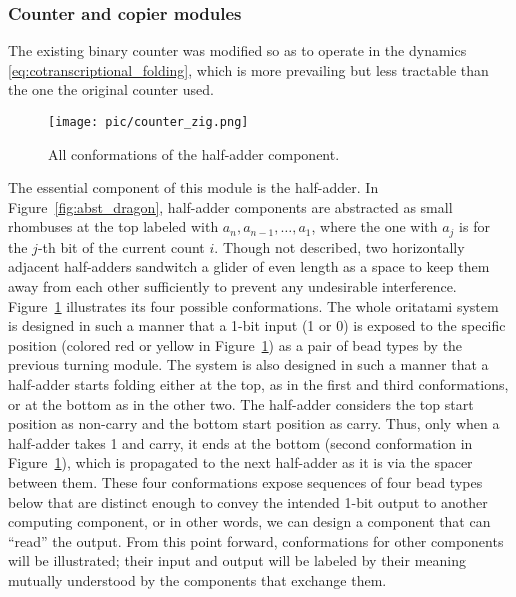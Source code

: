 			\subsubsection{Counter and copier modules}
			\label{subsubsec:module_counter}

The existing binary counter \cite{GeMeScSe2016} was modified so as to operate in the dynamics \eqref{eq:cotranscriptional_folding}, which is more prevailing \cite{GeMeScSe2015,HanKim2017,HaKiOtSe2016,OtaSeki2017} but less tractable than the one the original counter used. 

\begin{figure}[h]
\texttt{[image: pic/counter\_zig.png]}
 \caption{All conformations of the half-adder component.}
\label{fig:half-adder}
\end{figure}

The essential component of this module is the half-adder. 
In Figure~\ref{fig:abst_dragon}, half-adder components are abstracted as small rhombuses at the top labeled with $a_n, a_{n-1}, \ldots, a_1$, where the one with $a_j$ is for the $j$-th bit of the current count $i$. 
Though not described, two horizontally adjacent half-adders sandwitch a glider of even length as a space to keep them away from each other sufficiently to prevent any undesirable interference. 
Figure~\ref{fig:half-adder} illustrates its four possible conformations. 
The whole oritatami system is designed in such a manner that a 1-bit input (1 or 0) is exposed to the specific position (colored red or yellow in Figure~\ref{fig:half-adder}) as a pair of bead types by the previous turning module. 
The system is also designed in such a manner that a half-adder starts folding either at the top, as in the first and third conformations, or at the bottom as in the other two. 
The half-adder considers the top start position as non-carry and the bottom start position as carry. 
Thus, only when a half-adder takes 1 and carry, it ends at the bottom (second conformation in Figure~\ref{fig:half-adder}), which is propagated to the next half-adder as it is via the spacer between them. 
These four conformations expose sequences of four bead types below that are distinct enough to convey the intended 1-bit output to another computing component, or in other words, we can design a component that can ``read'' the output. 
From this point forward, conformations for other components will be illustrated; their input and output will be labeled by their meaning mutually understood by the components that exchange them. 

